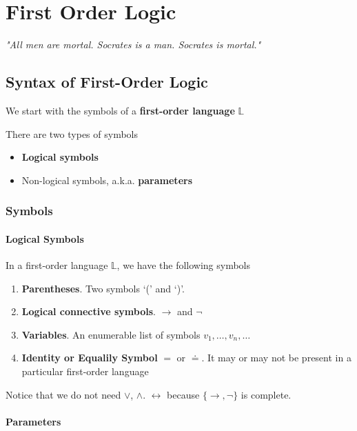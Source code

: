 \chapter{First Order Logic}

\emph{"All men are mortal. Socrates is a man. Socrates is mortal."}

\section{Syntax of First-Order Logic}

We start with the symbols of a \textbf{first-order language} $\mathbb{L}$

There are two types of symbols

\begin{itemize}
    \item \textbf{Logical symbols}
    \item Non-logical symbols, a.k.a. \textbf{parameters}
\end{itemize}

\subsection{Symbols}

\subsubsection{Logical Symbols}

In a first-order language $\mathbb{L}$, we have the following symbols

\begin{enumerate}
    \item \textbf{Parentheses}. Two symbols `(' and `)'.
    \item \textbf{Logical connective symbols}. $\to$ and $\neg$
    \item \textbf{Variables}. An enumerable list of symbols $v_1,\dots,v_n,\dots$
    \item \textbf{Identity or Equalily Symbol} $=$ or $\doteq$. It may or may not be present in a particular first-order language
\end{enumerate}

Notice that we do not need $\vee$, $\wedge$. $\leftrightarrow$ because $\{\to, \neg\}$ is complete.

\subsubsection{Parameters}


